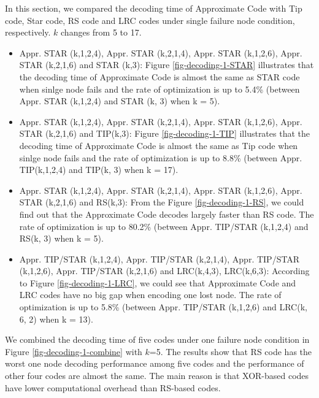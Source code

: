 \documentclass[sigconf]{acmart}
\begin{document}
In this section, we compared the decoding time of Approximate Code with Tip code, Star code, RS code and LRC codes under single failure node condition, respectively. $k$ changes from 5 to 17. 
\begin{itemize}
    \item Appr. STAR (k,1,2,4), Appr. STAR (k,2,1,4), Appr. STAR (k,1,2,6), Appr. STAR (k,2,1,6) and STAR (k,3): Figure \ref{fig-decoding-1-STAR} illustrates that the decoding time of Approximate Code is almost the same as STAR code when sinlge node fails and the rate of optimization is up to 5.4\% (between Appr. STAR (k,1,2,4) and STAR (k, 3) when k = 5). 
    \item Appr. STAR (k,1,2,4), Appr. STAR (k,2,1,4), Appr. STAR (k,1,2,6), Appr. STAR (k,2,1,6) and TIP(k,3): Figure \ref{fig-decoding-1-TIP} illustrates that the decoding time of Approximate Code is almost the same as Tip code when sinlge node fails and the rate of optimization is up to 8.8\% (between Appr. TIP(k,1,2,4) and TIP(k, 3) when k = 17).
    \item Appr. STAR (k,1,2,4), Appr. STAR (k,2,1,4), Appr. STAR (k,1,2,6), Appr. STAR (k,2,1,6) and RS(k,3): From the Figure \ref{fig-decoding-1-RS}, we could find out that the Approximate Code decodes largely faster than RS code. The rate of optimization is up to 80.2\% (between Appr. TIP/STAR (k,1,2,4) and RS(k, 3) when k = 5).
    \item Appr. TIP/STAR (k,1,2,4), Appr. TIP/STAR (k,2,1,4), Appr. TIP/STAR (k,1,2,6), Appr. TIP/STAR (k,2,1,6) and LRC(k,4,3), LRC(k,6,3):  According to Figure \ref{fig-decoding-1-LRC}, we could see that Approximate Code and LRC codes have no big gap when encoding one lost node. The rate of optimization is up to 5.8\% (between Appr. TIP/STAR (k,1,2,6) and LRC(k, 6, 2) when k = 13).
\end{itemize}

We combined the decoding time of five codes under one failure node condition in Figure \ref{fig-decoding-1-combine} with $k$=5. The results show that RS code has the worst one node decoding performance among five codes and the performance of other four codes are almost the same. The main reason is that XOR-based codes have lower computational overhead than RS-based codes.\par
\end{document}
